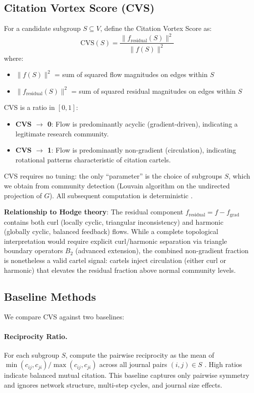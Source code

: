 \documentclass[11pt,letterpaper]{article}
\begin{document}
\subsection{Citation Vortex Score (CVS)}

For a candidate subgroup $S \subseteq V$, define the Citation Vortex Score as:
\[
  \mathrm{CVS}(S) = \frac{\|f_{\mathrm{residual}}(S)\|^2}{\|f(S)\|^2}
\]
where:
\begin{itemize}
  \item $\|f(S)\|^2$ = sum of squared flow magnitudes on edges within $S$
  \item $\|f_{\mathrm{residual}}(S)\|^2$ = sum of squared residual magnitudes on edges within $S$
\end{itemize}

CVS is a ratio in $[0, 1]$:
\begin{itemize}
  \item \textbf{CVS $\to$ 0}: Flow is predominantly acyclic (gradient-driven), indicating a legitimate research community.
  \item \textbf{CVS $\to$ 1}: Flow is predominantly non-gradient (circulation), indicating rotational patterns characteristic of citation cartels.
\end{itemize}

CVS requires no tuning: the only ``parameter'' is the choice of subgroups $S$, which we obtain from community detection (Louvain algorithm on the undirected projection of $G$). All subsequent computation is deterministic \citep{Priem2022}.

\textbf{Relationship to Hodge theory}: The residual component $f_{\mathrm{residual}} = f - f_{\mathrm{grad}}$ contains both curl (locally cyclic, triangular inconsistency) and harmonic (globally cyclic, balanced feedback) flows. While a complete topological interpretation would require explicit curl/harmonic separation via triangle boundary operators $B_2$ (advanced extension), the combined non-gradient fraction is nonetheless a valid cartel signal: cartels inject circulation (either curl or harmonic) that elevates the residual fraction above normal community levels.

\subsection{Baseline Methods}

We compare CVS against two baselines:

\paragraph{Reciprocity Ratio.}
For each subgroup $S$, compute the pairwise reciprocity as the mean of $\min(c_{ij}, c_{ji}) / \max(c_{ij}, c_{ji})$ across all journal pairs $(i, j) \in S$ \citep{Priem2022}. High ratios indicate balanced mutual citation. This baseline captures only pairwise symmetry and ignores network structure, multi-step cycles, and journal size effects.
\end{document}
